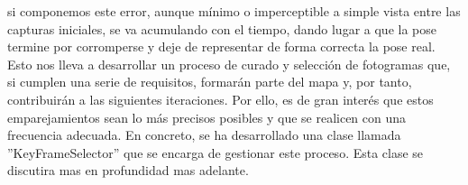 \documentclass[12pt, a4paper, twoside]{article}
\begin{document}
\begin{itemize}
  si componemos este error, aunque mínimo o imperceptible a simple vista entre las capturas iniciales, se va acumulando con el tiempo, dando lugar a que la pose termine 
  por corromperse y deje de representar de forma correcta la pose real. \newline
  Esto nos lleva a desarrollar un proceso de curado y selección de fotogramas que, si cumplen una serie de requisitos, formarán parte del mapa y, por tanto, 
  contribuirán a las siguientes iteraciones. Por ello, es de gran interés que estos emparejamientos sean lo más precisos posibles y que se realicen con una frecuencia 
  adecuada. En concreto, se ha desarrollado una clase llamada ''KeyFrameSelector'' que se encarga de gestionar este proceso. Esta clase se discutira mas en profundidad 
  mas adelante.
\end{itemize}
\end{document}
